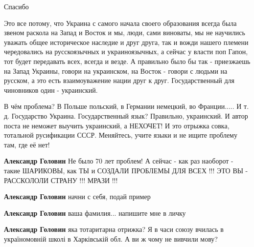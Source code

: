\begin{itemize}
Спасибо


Это все потому, что Украина с самого начала своего образования всегда была
звеном раскола на Запад и Восток и мы, люди, сами виноваты, мы не научились
уважать общее историческое наследие и друг друга, так и вожди нашего племени
чередовались на русскоязычных и украиноязычных, а сейчас у власти поп Гапон,
тот будет передавать всех, всегда и везде. А правильно было бы так - приезжаешь
на Запад Украины, говори на украинском, на Восток - говори с людьми на русском,
а это есть взаимоуважение нации друг к друг. Государственный для чиновников
один - украинский.


В чём проблема? В Польше польский, в Германии немецкий, во Франции..... И т. д.
Государство Украина. Государственный язык? Правильно, украинский. И автор поста
не неможет выучить украинский, а НЕХОЧЕТ! И это отрыжка совка, тотальной
русификации СССР. Меняйтесь, учите языки и не ищите проблему там, где её нет!

\begin{itemize}
\textbf{Александр Головин} Не было 70 лет проблем! А сейчас - как раз наоборот
- такие ШАРИКОВЫ, как ТЫ и СОЗДАЛИ ПРОБЛЕМЫ ДЛЯ ВСЕХ !!! ЭТО ВЫ - РАССКОЛОЛИ
СТРАНУ !!! МРАЗИ !!!

\textbf{Александр Головин} начни с себя, подай пример

\textbf{Александр Головин} ваша фамилия... напишите мне в личку

\textbf{Александр Головин} яка тотаритарна отрижка? Я в часи союзу вчилась в україномовній школі в Харківській обл. А ви ж чому не вивчили мову?




\end{itemize}
\end{itemize}
